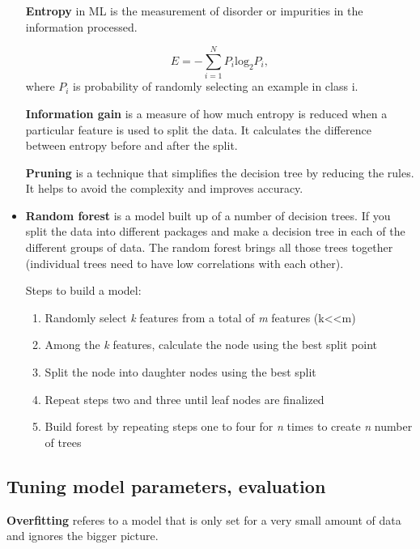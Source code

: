 \documentclass[
  letterpaper,
]{book}
\providecommand{\tightlist}{%
  \setlength{\itemsep}{0pt}\setlength{\parskip}{0pt}}\usepackage{longtable,booktabs,array}
\begin{document}
\begin{itemize}
  \textbf{Entropy} in ML is the measurement of disorder or impurities in
  the information processed.

  \[ E = -\sum^{N}_{i=1}P_{i}\text{log}_{2}P_{i}, \] where \(P_{i}\) is
  probability of randomly selecting an example in class i.

  \textbf{Information gain} is a measure of how much entropy is reduced
  when a particular feature is used to split the data. It calculates the
  difference between entropy before and after the split.

  \textbf{Pruning} is a technique that simplifies the decision tree by
  reducing the rules. It helps to avoid the complexity and improves
  accuracy.
\item
  \textbf{Random forest} is a model built up of a number of decision
  trees. If you split the data into different packages and make a
  decision tree in each of the different groups of data. The random
  forest brings all those trees together (individual trees need to have
  low correlations with each other).

  Steps to build a model:

  \begin{enumerate}
  \def\labelenumi{\arabic{enumi}.}
  \tightlist
  \item
    Randomly select \emph{k} features from a total of \emph{m} features
    (k\textless\textless m)
  \item
    Among the \emph{k} features, calculate the node using the best split
    point
  \item
    Split the node into daughter nodes using the best split
  \item
    Repeat steps two and three until leaf nodes are finalized
  \item
    Build forest by repeating steps one to four for \emph{n} times to
    create \emph{n} number of trees
  \end{enumerate}
\end{itemize}

\hypertarget{tuning-model-parameters-evaluation}{%
\subsection{Tuning model parameters,
evaluation}\label{tuning-model-parameters-evaluation}}

\textbf{Overfitting} referes to a model that is only set for a very
small amount of data and ignores the bigger picture.
\end{document}
